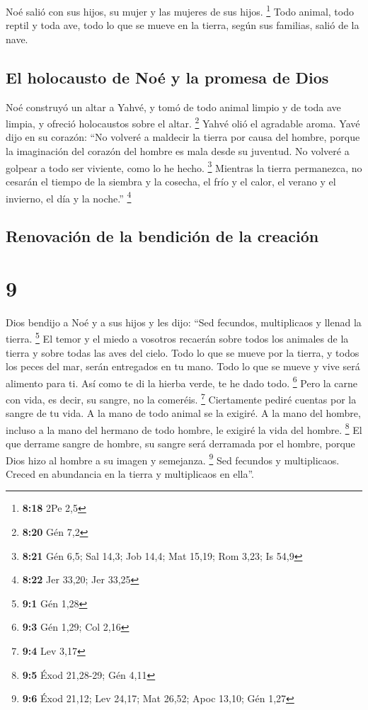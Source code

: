 Noé salió con sus hijos, su mujer y las mujeres de sus
hijos. \footnote{\textbf{8:18} 2Pe 2,5}  Todo animal,
todo reptil y toda ave, todo lo que se mueve en la tierra, según sus
familias, salió de la nave.

\hypertarget{el-holocausto-de-nouxe9-y-la-promesa-de-dios}{%
\subsection{El holocausto de Noé y la promesa de
Dios}\label{el-holocausto-de-nouxe9-y-la-promesa-de-dios}}

 Noé construyó un altar a Yahvé, y tomó de todo animal
limpio y de toda ave limpia, y ofreció holocaustos sobre el altar.
\footnote{\textbf{8:20} Gén 7,2}  Yahvé olió el agradable
aroma. Yavé dijo en su corazón: ``No volveré a maldecir la tierra por
causa del hombre, porque la imaginación del corazón del hombre es mala
desde su juventud. No volveré a golpear a todo ser viviente, como lo he
hecho. \footnote{\textbf{8:21} Gén 6,5; Sal 14,3; Job 14,4; Mat 15,19;
  Rom 3,23; Is 54,9}  Mientras la tierra permanezca, no
cesarán el tiempo de la siembra y la cosecha, el frío y el calor, el
verano y el invierno, el día y la noche.'' \footnote{\textbf{8:22} Jer
  33,20; Jer 33,25}

\hypertarget{renovaciuxf3n-de-la-bendiciuxf3n-de-la-creaciuxf3n}{%
\subsection{Renovación de la bendición de la
creación}\label{renovaciuxf3n-de-la-bendiciuxf3n-de-la-creaciuxf3n}}

\hypertarget{section-8}{%
\section{9}\label{section-8}}

 Dios bendijo a Noé y a sus hijos y les dijo: ``Sed
fecundos, multiplicaos y llenad la tierra. \footnote{\textbf{9:1} Gén
  1,28}  El temor y el miedo a vosotros recaerán sobre
todos los animales de la tierra y sobre todas las aves del cielo. Todo
lo que se mueve por la tierra, y todos los peces del mar, serán
entregados en tu mano.  Todo lo que se mueve y vive será
alimento para ti. Así como te di la hierba verde, te he dado todo.
\footnote{\textbf{9:3} Gén 1,29; Col 2,16}  Pero la carne
con vida, es decir, su sangre, no la comeréis. \footnote{\textbf{9:4}
  Lev 3,17}  Ciertamente pediré cuentas por la sangre de
tu vida. A la mano de todo animal se la exigiré. A la mano del hombre,
incluso a la mano del hermano de todo hombre, le exigiré la vida del
hombre. \footnote{\textbf{9:5} Éxod 21,28-29; Gén 4,11} 
El que derrame sangre de hombre, su sangre será derramada por el hombre,
porque Dios hizo al hombre a su imagen y semejanza. \footnote{\textbf{9:6}
  Éxod 21,12; Lev 24,17; Mat 26,52; Apoc 13,10; Gén 1,27} 
Sed fecundos y multiplicaos. Creced en abundancia en la tierra y
multiplicaos en ella''.

